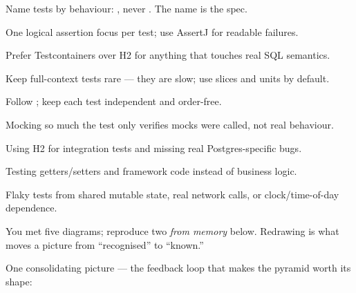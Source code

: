\begin{bestpractices}
\begin{wbitem}
  \item Name tests by behaviour: , never . The name is the spec.
  \item One logical assertion focus per test; use AssertJ for readable failures.
  \item Prefer Testcontainers over H2 for anything that touches real SQL semantics.
  \item Keep full-context  tests rare --- they are slow; use slices and units by default.
  \item Follow ; keep each test independent and order-free.
\end{wbitem}
\end{bestpractices}
\begin{mistakes}
\begin{wbitem}
  \item Mocking so much the test only verifies mocks were called, not real behaviour.
  \item Using H2 for integration tests and missing real Postgres-specific bugs.
  \item Testing getters/setters and framework code instead of business logic.
  \item Flaky tests from shared mutable state, real network calls, or clock/time-of-day dependence.
\end{wbitem}
\end{mistakes}


You met five diagrams; reproduce two \emph{from memory} below. Redrawing is what moves a picture from ``recognised'' to ``known.''

\begin{writespace}
\end{writespace}

\begin{writespace}
\end{writespace}

One consolidating picture --- the feedback loop that makes the pyramid worth its shape:


